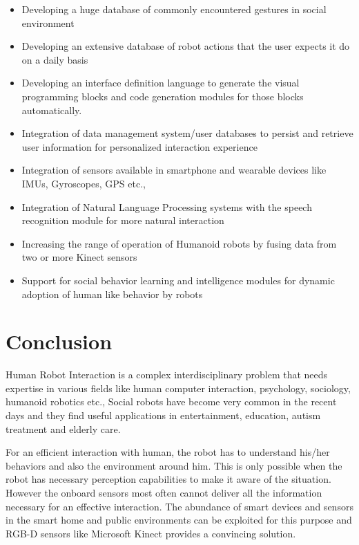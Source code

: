 \begin{itemize}
\item Developing a huge database of commonly encountered gestures in social environment
\item Developing an extensive database of robot actions that the user expects it do on a daily basis
\item Developing an interface definition language to generate the visual programming blocks and code generation modules for those blocks automatically.
\item Integration of data management system/user databases to persist and retrieve user information for personalized interaction experience
\item Integration of sensors available in smartphone and wearable devices like IMUs, Gyroscopes, GPS etc.,
\item Integration of Natural Language Processing systems with the speech recognition module for more natural interaction
\item Increasing the range of operation of Humanoid robots by fusing data from two or more Kinect sensors 
\item Support for social behavior learning and intelligence modules for dynamic adoption of human like behavior by robots
\end{itemize}

\section{Conclusion} %
Human Robot Interaction is a complex interdisciplinary problem that needs expertise in various fields like human computer interaction, psychology, sociology, humanoid robotics etc., Social robots have become very common in the recent days and they find useful applications in entertainment, education, autism treatment and elderly care. 

For an efficient interaction with human, the robot has to understand his/her behaviors and also the environment around him. This is only possible when the robot has necessary perception capabilities to make it aware of the situation. However the onboard sensors most often cannot deliver all the information necessary for an effective interaction. The abundance of smart devices and sensors in the smart home and public environments can be exploited for this purpose and RGB-D sensors like Microsoft Kinect provides a convincing solution.

